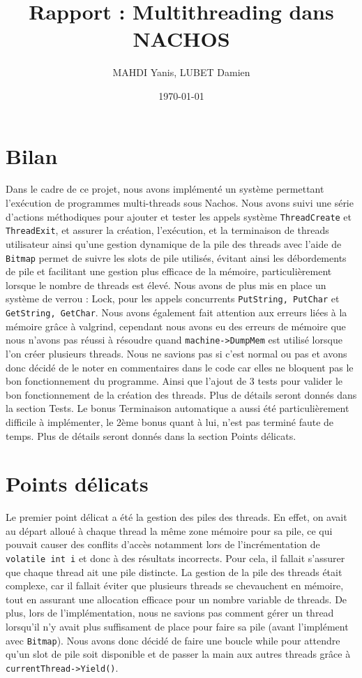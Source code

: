 \documentclass[a4paper,11pt]{article}
\title{Rapport : Multithreading dans NACHOS}
\author{MAHDI Yanis, LUBET Damien}
\date{\today}
\begin{document}
\maketitle
\tableofcontents


\section{Bilan}
Dans le cadre de ce projet, nous avons implémenté un système permettant l'exécution de programmes multi-threads sous Nachos.
 Nous avons suivi une série d'actions méthodiques pour ajouter et tester les appels système \texttt{ThreadCreate} et \texttt{ThreadExit},
  et assurer la création, l'exécution, et la terminaison de threads utilisateur ainsi qu'une gestion dynamique de la pile des threads avec l'aide de \texttt{Bitmap} permet de suivre les slots de pile utilisés, évitant ainsi les débordements de pile et facilitant une gestion plus efficace de la mémoire, particulièrement lorsque le nombre de threads est élevé.
  Nous avons de plus mis en place un système de verrou : Lock, pour les appels concurrents \texttt{PutString, PutChar} et \texttt{GetString, GetChar}.
Nous avons également fait attention aux erreurs liées à la mémoire grâce à valgrind, cependant nous avons eu des erreurs de mémoire que nous n'avons pas réussi à résoudre quand \texttt{machine->DumpMem} est utilisé lorsque l'on créer plusieurs threads. Nous ne savions pas si c'est normal ou pas et avons donc décidé de le noter en commentaires dans le code car elles ne bloquent pas le bon fonctionnement du programme.
Ainsi que l'ajout de 3 tests pour valider le bon fonctionnement de la création des threads. Plus de détails seront donnés dans la section Tests.
Le bonus Terminaison automatique a aussi été particulièrement difficile à implémenter, le 2ème bonus quant à lui, n'est pas terminé faute de temps. Plus de détails seront donnés dans la section Points délicats.

\section{Points délicats}

Le premier point délicat a été la gestion des piles des threads. En effet, on avait au départ alloué à chaque thread la même zone mémoire pour sa pile, ce qui pouvait causer des conflits d'accès notamment lors de l'incrémentation de \texttt{volatile int i} et donc à des résultats incorrects.
Pour cela, il fallait s'assurer que chaque thread ait une pile distincte. La gestion de la pile des threads était complexe, car il fallait éviter que plusieurs threads se chevauchent en mémoire, tout en assurant une allocation efficace pour un nombre variable de threads. De plus, lors de l'implémentation, nous ne savions pas comment gérer un thread lorsqu'il n'y avait plus suffisament de place pour faire sa pile (avant l'implément avec \texttt{Bitmap}). Nous avons donc décidé de faire une boucle while pour attendre qu'un slot de pile soit disponible et de passer la main aux autres threads grâce à \texttt{currentThread->Yield()}.
\end{document}
